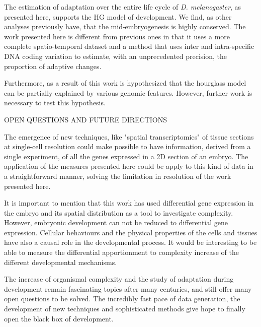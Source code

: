 The estimation of adaptation over the entire life cycle of \textit{D. melanogaster}, as presented here, supports the HG model of development. We find, as other analyses previously have, that the mid-embryogenesis is highly conserved. The work presented here is different from previous ones in that it uses a more complete spatio-temporal dataset and a method that uses inter and intra-specific DNA coding variation to estimate, with an unprecedented precision, the proportion of adaptive changes.

Furthermore, as a result of this work is hypothesized that the hourglass model can be partially explained by various genomic features. However, further work is necessary to test this hypothesis.



OPEN QUESTIONS AND FUTURE DIRECTIONS

The emergence of new techniques, like "spatial transcriptomics" of tissue sections at single-cell resolution \citep{Stahl2016} could make possible to have information, derived from a single experiment, of all the genes expressed in a 2D section of an embryo. The application of the measures presented here could be apply to this kind of data in a straightforward manner, solving the limitation in resolution of the work presented here.

It is important to mention that this work has used differential gene expression in the embryo and its spatial distribution as a tool to investigate complexity. However, embryonic development can not be reduced to differential gene expression. Cellular behaviours and the physical properties of the cells and tissues have also a causal role in the developmental process. It would be interesting to be able to measure the differential apportionment to complexity increase of the different developmental mechanisms.


The increase of organismal complexity and the study of adaptation during development remain fascinating topics after many centuries, and still offer many open questions to be solved. The incredibly fast pace of data generation, the development of new techniques and sophisticated methods give hope to finally open the black box of development.

